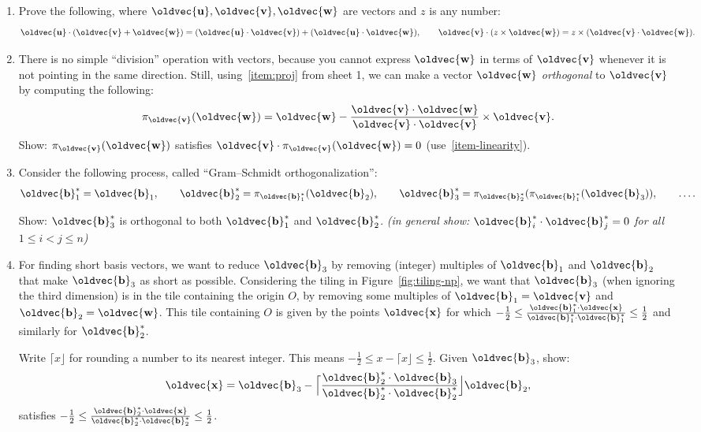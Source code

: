 \documentclass[10pt,a4paper]{article}
\renewcommand{\vec}[1]{\oldvec{\mathbf{#1}}}
\begin{document}
\begin{enumerate}
\item\label{item-linearity}
	Prove the following, where \(\vec{u},\vec{v},\vec{w}\) are vectors and \(z\) is any number:
	\[
		\vec{u} \cdot (\vec{v} + \vec{w}) = (\vec{u} \cdot \vec{v}) + (\vec{u} \cdot \vec{w}),
		\qquad
		\vec{v} \cdot (z \times \vec{w}) = z \times (\vec{v} \cdot \vec{w}).
	\]

	\item
		There is no simple ``division'' operation with vectors, because you cannot express \(\vec{w}\) in terms of \(\vec{v}\) whenever it is not pointing in the same direction.
	Still, using~\ref{item:proj} from sheet 1,
	we can make a vector \(\vec{w}\) \emph{orthogonal} to \(\vec{v}\) by computing the following:
	\[
		\pi_{\vec{v}}(\vec{w}) = \vec{w} - \frac{\vec{v} \cdot \vec{w}}{\vec{v} \cdot \vec{v}} \times \vec{v}.
	\]
	Show: \(\pi_{\vec{v}}(\vec{w})\) satisfies \(\vec{v} \cdot \pi_{\vec{v}}(\vec{w}) = 0\) (use~\ref{item-linearity}).

	\item
		Consider the following process, called ``Gram--Schmidt orthogonalization'':
		\[
			\vec{b}_1^* = \vec{b}_1, \qquad
			\vec{b}_2^* = \pi_{\vec{b}_1^*}(\vec{b}_2), \qquad
			\vec{b}_3^* = \pi_{\vec{b}_2^*}(\pi_{\vec{b}_1^*}(\vec{b}_3)), \qquad
			\ldots.
		\]

		Show: \(\vec{b}_3^*\) is orthogonal to both \(\vec{b}_1^*\) and \(\vec{b}_2^*\).
		\emph{(in general show: \(\vec{b}_i^* \cdot \vec{b}_j^* = 0\) for all \(1 \leq i < j \leq n\))}

	\item
		For finding short basis vectors, we want to reduce \(\vec{b}_3\) by removing (integer) multiples of \(\vec{b}_1\) and \(\vec{b}_2\) that make \(\vec{b}_3\) as short as possible.
		Considering the tiling in Figure~\ref{fig:tiling-np}, we want that \(\vec{b}_3\) (when ignoring the third dimension) is in the tile containing the origin \(O\), by removing some multiples of \(\vec{b}_1 = \vec{v}\) and \(\vec{b}_2 = \vec{w}\).
		This tile containing \(O\) is given by the points \(\vec{x}\) for which \(-\frac12 \leq \frac{\vec{b}_1^* \cdot \vec{x}}{\vec{b}_1^* \cdot \vec{b}_1^*} \leq \frac12\) and similarly for \(\vec{b}_2^*\).

		Write \(\lceil x \rfloor\) for rounding a number to its nearest integer.
		This means \(-\frac12 \leq x - \lceil x \rfloor \leq \frac12\).
		Given \(\vec{b}_3\), show:
		\[
			\vec{x} = \vec{b}_3 - \Big\lceil \frac{\vec{b}_2^* \cdot \vec{b}_3}{\vec{b}_2^* \cdot \vec{b}_2^*} \Big\rfloor \vec{b}_2,
		\]
		satisfies \(-\frac12 \leq \frac{\vec{b}_2^* \cdot \vec{x}}{\vec{b}_2^* \cdot \vec{b}_2^*} \leq \frac12\).


\end{enumerate}
\end{document}

